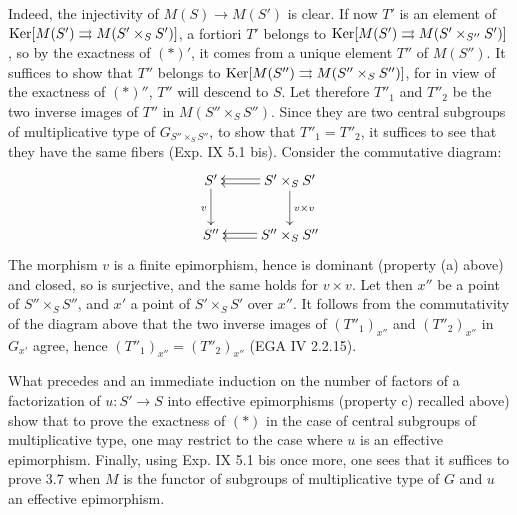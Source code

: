 Indeed, the injectivity of $M(S)\to M(S')$ is clear. If now $T'$ is an element of $\operatorname{Ker}[M(S')\rightrightarrows M(S'\times_S S')]$, a fortiori $T'$ belongs to $\operatorname{Ker}[M(S')\rightrightarrows M(S'\times_{S''}S')]$, so by the exactness of $(\ast)'$, it comes from a unique element $T''$ of $M(S'')$. It suffices to show that $T''$ belongs to $\operatorname{Ker}[M(S'')\rightrightarrows M(S''\times_S S'')]$, for in view of the exactness of $(\ast)''$, $T''$ will descend to $S$. Let therefore $T''_1$ and $T''_2$ be the two inverse images of $T''$ in $M(S''\times_S S'')$. Since they are two central subgroups of multiplicative type of $G_{S''\times_S S''}$, to show that $T''_1=T''_2$, it suffices to see that they have the same fibers (Exp. IX 5.1 bis). Consider the commutative diagram:
\[
\xymatrix{S'\ar[d]_v&S'\times_S S'\ar@<.4ex>[l]\ar@<-.4ex>[l]\ar[d]^{v\times v}\\S''&S''\times_S S''\ar@<.4ex>[l]\ar@<-.4ex>[l].}
\]
The morphism $v$ is a finite epimorphism, hence is dominant (property (a) above) and closed, so is surjective, and the same holds for $v\times v$. Let then $x''$ be a point of $S''\times_S S''$, and $x'$ a point of $S'\times_S S'$ over $x''$. It follows from the commutativity of the diagram above that the two inverse images of $(T''_1)_{x''}$ and $(T''_2)_{x''}$ in $G_{x'}$ agree, hence $(T''_1)_{x''}=(T''_2)_{x''}$ (EGA IV 2.2.15).

What precedes and an immediate induction on the number of factors of a factorization of $u:S'\to S$ into effective epimorphisms (property c) recalled above) show that to prove the exactness of $(\ast)$ in the case of central subgroups of multiplicative type, one may restrict to the case where $u$ is an effective epimorphism. Finally, using Exp. IX 5.1 bis once more, one sees that it suffices to prove 3.7 when $M$ is the functor of subgroups of multiplicative type of $G$ and $u$ an effective epimorphism.

